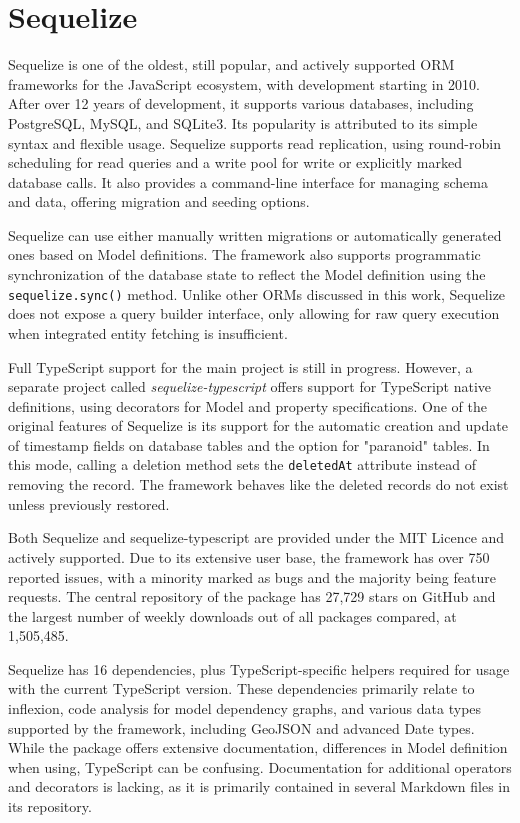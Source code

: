 \section{Sequelize}

Sequelize is one of the oldest, still popular, and actively supported ORM
frameworks for the JavaScript ecosystem, with development starting in 2010.
After over 12 years of development, it supports various databases, including
PostgreSQL, MySQL, and SQLite3. Its popularity is attributed to its simple
syntax and flexible usage. Sequelize supports read replication, using
round-robin scheduling for read queries and a write pool for write or explicitly
marked database calls. It also provides a command-line interface for managing
schema and data, offering migration and seeding options.

Sequelize can use either manually written migrations or automatically generated
ones based on Model definitions. The framework also supports programmatic
synchronization of the database state to reflect the Model definition using the
\texttt{sequelize.sync()} method. Unlike other ORMs discussed in this work,
Sequelize does not expose a query builder interface, only allowing for raw query
execution when integrated entity fetching is insufficient.

Full TypeScript support for the main project is still in progress. However, a
separate project called \textit{sequelize-typescript} offers support for
TypeScript native definitions, using decorators for Model and property
specifications. One of the original features of Sequelize is its support for the
automatic creation and update of timestamp fields on database tables and the
option for "paranoid" tables. In this mode, calling a deletion method sets the
\texttt{deletedAt} attribute instead of removing the record. The framework
behaves like the deleted records do not exist unless previously restored.

Both Sequelize and sequelize-typescript are provided under the MIT Licence and
actively supported. Due to its extensive user base, the framework has over 750
reported issues, with a minority marked as bugs and the majority being feature
requests. The central repository of the package has 27,729 stars on GitHub and
the largest number of weekly downloads out of all packages compared, at
1,505,485.

Sequelize has 16 dependencies, plus TypeScript-specific helpers required for
usage with the current TypeScript version. These dependencies primarily relate
to inflexion, code analysis for model dependency graphs, and various data types
supported by the framework, including GeoJSON and advanced Date types. While the
package offers extensive documentation, differences in Model definition when
using, TypeScript can be confusing. Documentation for additional operators and
decorators is lacking, as it is primarily contained in several Markdown files in
its repository.

